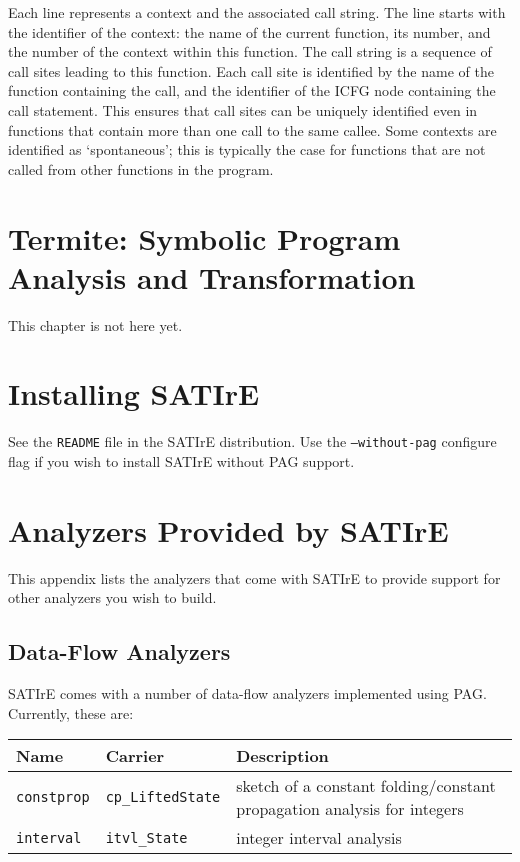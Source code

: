 \documentclass[a4paper,12pt]{report}
\begin{document}
Each line represents a context and the associated call string. The line
starts with the identifier of the context: the name of the current function,
its number, and the number of the context within this function. The call
string is a sequence of call sites leading to this function. Each call site
is identified by the name of the function containing the call, and the
identifier of the ICFG node containing the call statement. This ensures that
call sites can be uniquely identified even in functions that contain more
than one call to the same callee. Some contexts are identified as
`spontaneous'; this is typically the case for functions that are not called
from other functions in the program.

\chapter{Termite: Symbolic Program Analysis and Transformation}
\label{chap:termite}

This chapter is not here yet.

\appendix

\chapter{Installing SATIrE}
\label{appendix:installing}

See the \texttt{README} file in the SATIrE distribution. Use the
\texttt{--without-pag} configure flag if you wish to install SATIrE without
PAG support.

\chapter{Analyzers Provided by SATIrE}
\label{appendix:analyzers}

This appendix lists the analyzers that come with SATIrE to provide support
for other analyzers you wish to build.

\section{Data-Flow Analyzers}
\label{sec:analysis_dataflow}

SATIrE comes with a number of data-flow analyzers implemented using PAG.
Currently, these are:

\begin{center}
\begin{tabular}{l l p{}}
Name & Carrier & Description \\
\hline
\texttt{constprop} & \verb|cp_LiftedState| &
    sketch of a constant folding/constant propagation analysis for
    integers\\
\texttt{interval} & \verb|itvl_State| &
    integer interval analysis\\
\end{tabular}
\end{center}
\end{document}
